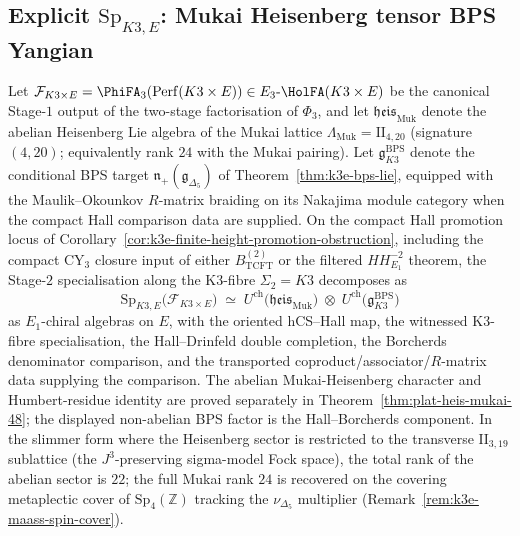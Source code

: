 \subsection{Explicit \texorpdfstring{$\mathrm{Sp}_{K3, E}$}{Sp-K3, E}: Mukai Heisenberg tensor BPS Yangian}
\label{subsec:k3e-platonic-sp-k3e}

\begin{theorem}
\label{thm:plat-Sp-K3E}
Let $\mathcal{F}_{K3 \times E} = \PhiFA_3(\mathrm{Perf}(K3 \times E)) \in E_3\text{-}\HolFA(K3 \times E)$ be the canonical Stage-$1$ output of the two-stage factorisation of $\Phi_3$, and let $\mathfrak{heis}_{\mathrm{Muk}}$ denote the abelian Heisenberg Lie algebra of the Mukai lattice $\Lambda_{\mathrm{Muk}} = \mathrm{II}_{4, 20}$ (signature $(4, 20)$; equivalently rank $24$ with the Mukai pairing). Let $\mathfrak{g}^{\mathrm{BPS}}_{K3}$ denote the conditional BPS target $\mathfrak{n}_+(\mathfrak{g}_{\Delta_5})$ of Theorem~\ref{thm:k3e-bps-lie}, equipped with the Maulik--Okounkov $R$-matrix braiding on its Nakajima module category when the compact Hall comparison data are supplied. On the compact Hall promotion locus of Corollary~\ref{cor:k3e-finite-height-promotion-obstruction}, including the compact CY$_3$ closure input of either $B_{\mathrm{TCFT}}^{(2)}$ or the filtered $HH^{-2}_{E_1}$ theorem, the Stage-$2$ specialisation along the K3-fibre $\Sigma_2 = K3$ decomposes as
\begin{equation}
\label{eq:plat-Sp-K3E}
 \mathrm{Sp}_{K3, E}\bigl(\mathcal{F}_{K3 \times E}\bigr) \;\simeq\; U^{\mathrm{ch}}\bigl(\mathfrak{heis}_{\mathrm{Muk}}\bigr) \;\otimes\; U^{\mathrm{ch}}\bigl(\mathfrak{g}^{\mathrm{BPS}}_{K3}\bigr)
\end{equation}
as $E_1$-chiral algebras on $E$, with the oriented hCS--Hall map,
the witnessed K3-fibre specialisation, the Hall--Drinfeld double
completion, the Borcherds denominator comparison, and the transported
coproduct/associator/$R$-matrix data supplying the comparison. The abelian
Mukai-Heisenberg character and Humbert-residue identity are proved
separately in Theorem~\ref{thm:plat-heis-mukai-48}; the displayed
non-abelian BPS factor is the Hall--Borcherds component. In
the slimmer form where the Heisenberg sector is restricted to the
transverse $\mathrm{II}_{3, 19}$ sublattice (the $J^3$-preserving
sigma-model Fock space), the total rank of the abelian sector is $22$;
the full Mukai rank $24$ is recovered on the covering metaplectic cover
of $\mathrm{Sp}_4(\mathbb{Z})$ tracking the $\nu_{\Delta_5}$ multiplier
(Remark~\ref{rem:k3e-maass-spin-cover}).
\end{theorem}

